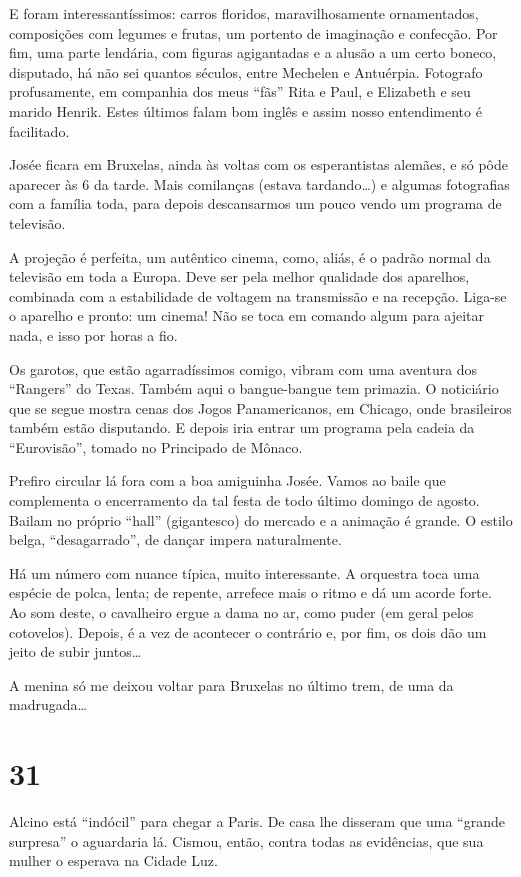 E foram interessantíssimos: carros floridos, maravilhosamente ornamentados, composições com legumes e frutas, um portento de imaginação e confecção. Por fim, uma parte lendária, com figuras agigantadas e a alusão a um certo boneco, disputado, há não sei quantos séculos, entre Mechelen e Antuérpia. Fotografo profusamente, em companhia dos meus “fãs” Rita e Paul, e Elizabeth e seu marido Henrik. Estes últimos falam bom inglês e assim nosso entendimento é facilitado.

Josée ficara em Bruxelas, ainda às voltas com os esperantistas alemães, e só pôde aparecer às 6 da tarde. Mais comilanças (estava tardando\ldots) e algumas fotografias com a família toda, para depois descansarmos um pouco vendo um programa de televisão.

A projeção é perfeita, um autêntico cinema, como, aliás, é o padrão normal da televisão em toda a Europa. Deve ser pela melhor qualidade dos aparelhos, combinada com a estabilidade de voltagem na transmissão e na recepção. Liga-se o aparelho e pronto: um cinema! Não se toca em comando algum para ajeitar nada, e isso por horas a fio.

Os garotos, que estão agarradíssimos comigo, vibram com uma aventura dos “Rangers” do Texas. Também aqui o bangue-bangue tem primazia. O noticiário que se segue mostra cenas dos Jogos Panamericanos, em Chicago, onde brasileiros também estão disputando. E depois iria entrar um programa pela cadeia da “Eurovisão”, tomado no Principado de Mônaco.

Prefiro circular lá fora com a boa amiguinha Josée. Vamos ao baile que complementa o encerramento da tal festa de todo último domingo de agosto. Bailam no próprio “hall” (gigantesco) do mercado e a animação é grande. O estilo belga, “desagarrado”, de dançar impera naturalmente.

Há um número com nuance típica, muito interessante. A orquestra toca uma espécie de polca, lenta; de repente, arrefece mais o ritmo e dá um acorde forte. Ao som deste, o cavalheiro ergue a dama no ar, como puder (em geral pelos cotovelos). Depois, é a vez de acontecer o contrário e, por fim, os dois dão um jeito de subir juntos\ldots

A menina só me deixou voltar para Bruxelas no último trem, de uma da madrugada\ldots

\section*{31 \adfflatleafright {}}
Alcino está “indócil” para chegar a Paris. De casa lhe disseram que uma “grande surpresa” o aguardaria lá. Cismou, então, contra todas as evidências, que sua mulher o esperava na Cidade Luz.


